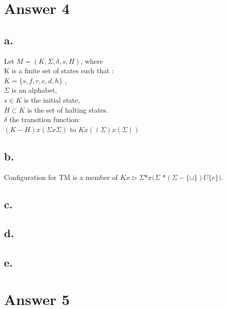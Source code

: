 \documentclass[12pt]{article}
\begin{document}
\section*{Answer 4}

\subsection*{a.}
Let $M = (K, \Sigma, \delta, s, H)$, where \\
K is a finite set of states such that : \\
$K = \{s, f, r, e, d, h\}$ ,\\
$\Sigma$ is an alphabet, \\
$s \in K$ is the initial state, \\
$H \subset K $ is the set of halting states. \\
$\delta$ the transition function: \\
$(K-H) x (\Sigma x \Sigma)$ to $ K x ((\Sigma) x (\Sigma))$ \\
\subsection*{b.}
Configuration for TM is a member of $ K x \triangleright \Sigma$*$ x (\Sigma$ *$ (\Sigma - \{ \sqcup \}) U \{ e \})$. \\
\subsection*{c.}

\subsection*{d.}

\subsection*{e.}




\section*{Answer 5}
\end{document}
